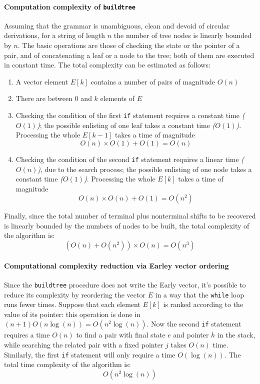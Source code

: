\paragraph*{Computation complexity of \texttt{buildtree}}
Assuming that the grammar is unambiguous, clean and devoid of circular derivations, for a string of length $n$ the number of tree nodes is linearly bounded by $n$.
The basic operations are those of checking the state or the pointer of a pair, and of concatenating a leaf or a node to the tree; both of them are executed in constant time.
The total complexity can be estimated as follows:
\begin{enumerate}
  \item A vector element $E[k]$ contains a number of pairs of magnitude $O(n)$
  \item There are between $0$ and $k$ elements of $E$
        \item Checking the condition of the first \texttt{if} statement requires a constant time \textit{($O(1)$)}; the possible enlisting of one leaf takes a constant time \textit{($O(1)$)}. Processing the whole $E[k-1]$ takes a time of magnitude
        \[ O(n) \times O(1) + O(1) = O(n) \]
        \item Checking the condition of the second \texttt{if} statement requires a linear time \textit{($O(n)$)}, due to the search process; the possible enlisting of one node takes a constant time \textit{($O(1)$)}. Processing the whole $E[k]$ takes a time of magnitude
        \[ O(n) \times O(n) + O(1) = O\left( n^2 \right)  \]
\end{enumerate}
Finally, since the total number of terminal plus nonterminal shifts to be recovered is linearly bounded by the numbers of nodes to be built, the total complexity of the algorithm is:
\[\left( O(n) + O\left( n^2 \right) \right) \times O(n) = O\left( n^3 \right) \]

\paragraph*{Computational complexity reduction via Earley vector ordering}
Since the \texttt{buildtree} procedure does not write the Early vector, it's possible to reduce its complexity by reordering the vector $E$ in a way that the \texttt{while} loop runs fewer times.
Suppose that each element $E[k]$ is ranked according to the value of its pointer:
this operation is done in $(n+1) O\left( n \log{(n)} \right) = O\left( n^2 \log{(n)} \right)$.
Now the second \texttt{if} statement requires a time $O(n)$ to find a pair with final state $e$ and pointer $h$ in the stack, while searching the related pair with a fixed pointer $j$ takes $O(n)$ time.
Similarly, the first \texttt{if} statement will only require a time $O\left( \log{(n)} \right)$.
The total time complexity of the algorithm is:
\[ O\left( n^2 \log{(n)} \right)\]

